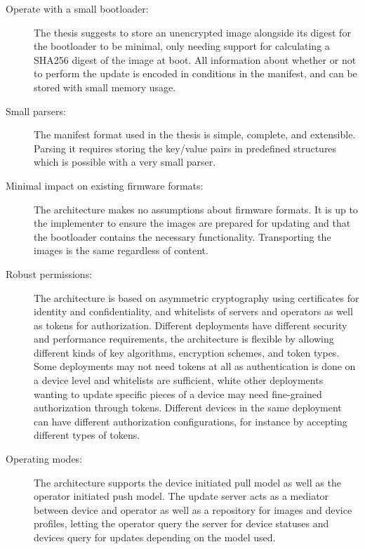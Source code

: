 \documentclass[0-thesis.tex]{subfiles}
\begin{document}
\begin{description}
    \item[Operate with a small bootloader:]
        The thesis suggests to store an unencrypted image alongside its digest for the
        bootloader to be minimal, only needing support for calculating a SHA256 digest of
        the image at boot. All information about whether or not to perform the update is
        encoded in conditions in the manifest, and can be stored with small memory usage.

    \item[Small parsers:]
        The manifest format used in the thesis is simple, complete, and extensible.
        Parsing it requires storing the key/value pairs in predefined structures which is
        possible with a very small parser.

    \item[Minimal impact on existing firmware formats:]
        The architecture makes no assumptions about firmware formats. It is up to the
        implementer to ensure the images are prepared for updating and that the bootloader
        contains the necessary functionality. Transporting the images is the same
        regardless of content.

    \item[Robust permissions:]
        The architecture is based on asymmetric cryptography using certificates for
        identity and confidentiality, and whitelists of servers and operators as well as
        tokens for authorization. Different deployments have different security and
        performance requirements, the architecture is flexible by allowing different kinds
        of key algorithms, encryption schemes, and token types. Some deployments may not
        need tokens at all as authentication is done on a device level and whitelists are
        sufficient, white other deployments wanting to update specific pieces of a device
        may need fine-grained authorization through tokens. Different devices in the same
        deployment can have different authorization configurations, for instance by
        accepting different types of tokens.

    \item[Operating modes:]
        The architecture supports the device initiated pull model as well as the operator
        initiated push model. The update server acts as a mediator between device and
        operator as well as a repository for images and device profiles, letting the
        operator query the server for device statuses and devices query for updates
        depending on the model used.
\end{description}
  
\end{document}
